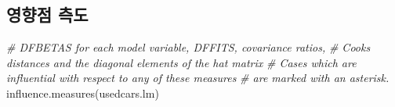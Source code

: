 \documentclass[
]{book}
\newenvironment{Shaded}{\begin{snugshade}}{\end{snugshade}}
\newcommand{\CommentTok}[1]{\textcolor[rgb]{0.56,0.35,0.01}{\textit{#1}}}
\newcommand{\FunctionTok}[1]{\textcolor[rgb]{0.00,0.00,0.00}{#1}}
\newcommand{\NormalTok}[1]{#1}
\begin{document}
\hypertarget{uxc601uxd5a5uxc810-uxce21uxb3c4}{%
\subsection{영향점 측도}\label{uxc601uxd5a5uxc810-uxce21uxb3c4}}

\begin{Shaded}
\begin{Highlighting}[]
\CommentTok{\# DFBETAS for each model variable, DFFITS, covariance ratios, }
\CommentTok{\# Cook\textquotesingle{}s distances and the diagonal elements of the hat matrix}
\CommentTok{\# Cases which are influential with respect to any of these measures }
\CommentTok{\# are marked with an asterisk.}
\FunctionTok{influence.measures}\NormalTok{(usedcars.lm)}
\end{Highlighting}
\end{Shaded}
\end{document}
